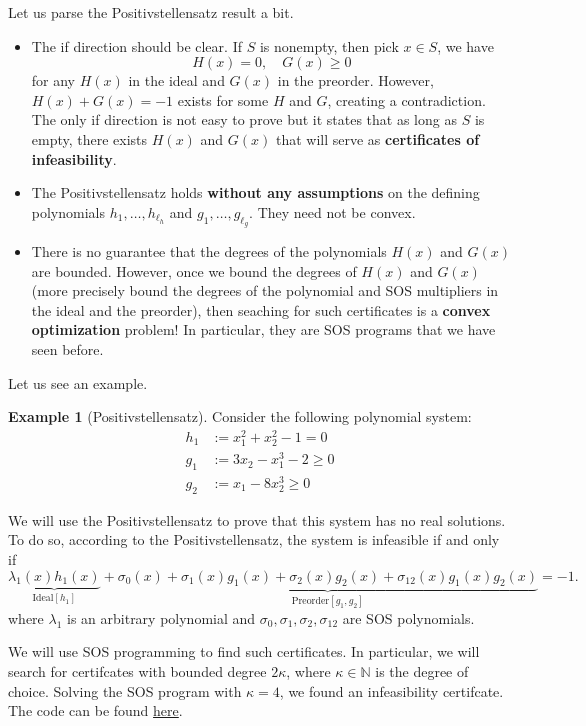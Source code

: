 \documentclass[
]{book}
\theoremstyle{definition}
\theoremstyle{definition}
\newtheorem{example}{Example}[chapter]
\theoremstyle{definition}
\theoremstyle{definition}
\theoremstyle{remark}
\begin{document}
Let us parse the Positivstellensatz result a bit.

\begin{itemize}
\item
  The if direction should be clear. If \(S\) is nonempty, then pick \(x \in S\), we have
  \[
  H(x) = 0, \quad G(x) \geq 0
  \]
  for any \(H(x)\) in the ideal and \(G(x)\) in the preorder. However, \(H(x) + G(x) = -1\) exists for some \(H\) and \(G\), creating a contradiction. The only if direction is not easy to prove but it states that as long as \(S\) is empty, there exists \(H(x)\) and \(G(x)\) that will serve as \textbf{certificates of infeasibility}.
\item
  The Positivstellensatz holds \textbf{without any assumptions} on the defining polynomials \(h_1,\dots,h_{\ell_h}\) and \(g_1,\dots,g_{\ell_g}\). They need not be convex.
\item
  There is no guarantee that the degrees of the polynomials \(H(x)\) and \(G(x)\) are bounded. However, once we bound the degrees of \(H(x)\) and \(G(x)\) (more precisely bound the degrees of the polynomial and SOS multipliers in the ideal and the preorder), then seaching for such certificates is a \textbf{convex optimization} problem! In particular, they are SOS programs that we have seen before.
\end{itemize}

Let us see an example.

\begin{example}[Positivstellensatz]
\protect\hypertarget{exm:Positivstellensatz}{}\label{exm:Positivstellensatz}Consider the following polynomial system:
\begin{equation}
\begin{split}
h_1 & := x_1^2 + x_2^2 -1 = 0 \\
g_1 & := 3x_2 - x_1^3 -2 \geq 0 \\
g_2 & := x_1 - 8 x_2^3 \geq 0
\end{split}
\end{equation}

We will use the Positivstellensatz to prove that this system has no real solutions. To do so, according to the Positivstellensatz, the system is infeasible if and only if
\[
\underbrace{\lambda_1(x) h_1(x)}_{\mathrm{Ideal}[h_1]} + \underbrace{\sigma_0(x) + \sigma_1(x) g_1(x) + \sigma_2(x) g_2(x) + \sigma_{12}(x) g_1(x) g_2(x)}_{\mathrm{Preorder}[g_1,g_2]} = -1.
\]
where \(\lambda_1\) is an arbitrary polynomial and \(\sigma_0,\sigma_1,\sigma_2,\sigma_{12}\) are SOS polynomials.

We will use SOS programming to find such certificates. In particular, we will search for certifcates with bounded degree \(2\kappa\), where \(\kappa \in \mathbb{N}\) is the degree of choice. Solving the SOS program with \(\kappa=4\), we found an infeasibility certifcate. The code can be found \href{https://github.com/ComputationalRobotics/Semidefinite-Examples/blob/main/example_infeasibility.m}{here}.
\end{example}
\end{document}
